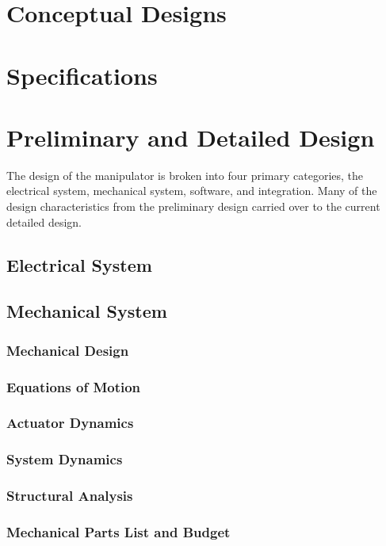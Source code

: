 

\normalem


\section{Conceptual Designs}


\newpage
\section{Specifications}

\newpage
\section{Preliminary and Detailed Design}
The design of the manipulator is broken into four primary categories, the electrical system, mechanical system, software, and integration. Many of the design characteristics from the preliminary design carried over to the current detailed design.
\subsection{Electrical System}

\subsection{Mechanical System}

\subsubsection{Mechanical Design}

\subsubsection{Equations of Motion}

\subsubsection{Actuator Dynamics}

\subsubsection{System Dynamics}

\newpage
\subsubsection{Structural Analysis}

\newpage
\subsubsection{Mechanical Parts List and Budget}

% 

